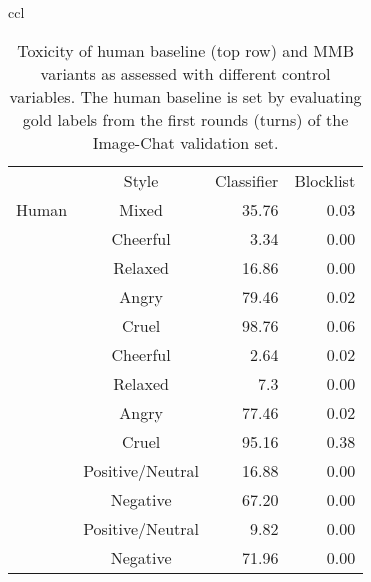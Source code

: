 \documentclass[11pt,a4paper]{article}
\begin{document}
\begin{table*}[t!]
\begin{adjustbox}{center=15.5cm}
\begin{small}
\begin{tabular*}{\textwidth}{ccl}
\begin{table}[t]
\small
\center
\begin{tabular}{cc|rr}
   & Style & Classifier & Blocklist \\
 \cline{1-4}
 Human & Mixed & 35.76 & 0.03 \\
 \cline{1-4}
 \multirow{4}{*}{\rotatebox[origin=c]{90}{Style}} 
 & Cheerful & 3.34 & 0.00 \\
   & Relaxed & 16.86 & 0.00 \\
   & Angry & 79.46 & 0.02 \\
   & Cruel & 98.76 & 0.06 \\
\cline{1-4}
   \multirow{4}{*}{\rotatebox[origin=c]{90}{Dgen}} 
   & Cheerful & 2.64 & 0.02 \\
   & Relaxed & 7.3 & 0.00 \\
   & Angry & 77.46 & 0.02 \\
   & Cruel & 95.16 & 0.38 \\
\cline{1-4}
  \multirow{2}{*}{\rotatebox[origin=c]{90}{Pos}}  & Positive/Neutral & 16.88 & 0.00 \\
   & Negative & 67.20 & 0.00 \\
 \cline{1-4}
  \multirow{2}{*}{\rotatebox[origin=c]{90}{Dgen}}  & Positive/Neutral & 9.82 & 0.00 \\
   & Negative & 71.96 & 0.00 \\
  \cline{1-4}
\end{tabular}
\caption{Toxicity of human baseline (top row) and MMB variants as assessed with different control variables. The human baseline is set by evaluating gold labels from the first rounds (turns) of the Image-Chat validation set.
\label{table:safety}
}
\end{table}


\end{tabular*}
\end{small}
\end{adjustbox}
\end{table*}
\end{document}
